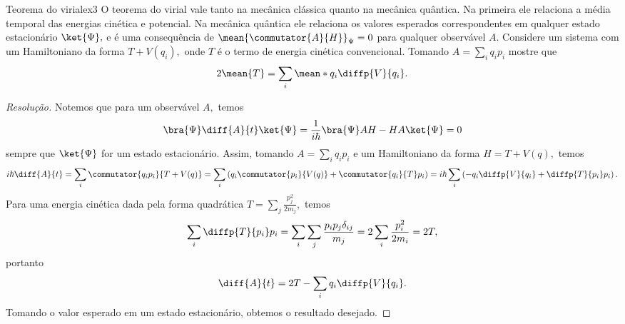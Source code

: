 \begin{exercício}{Teorema do virial}{ex3}
   O teorema do virial vale tanto na mecânica clássica quanto na mecânica quântica. Na primeira ele relaciona a média temporal das energias cinética e potencial. Na mecânica quântica ele relaciona os valores esperados correspondentes em qualquer estado estacionário \(\ket{\Psi},\) e é uma consequência de \(\mean{\commutator{A}{H}}_\Psi = 0\) para qualquer observável \(A.\) Considere um sistema com um Hamiltoniano da forma \(T + V(q_i),\) onde \(T\) é o termo de energia cinética convencional. Tomando \(A = \sum_i q_i p_i\) mostre que
   \begin{equation*}
      2 \mean{T} = \sum_i \mean*{q_i \diffp{V}{q_i}}.
   \end{equation*}
\end{exercício}
\begin{proof}[Resolução]
   Notemos que para um observável \(A,\) temos
   \begin{equation*}
      \bra{\Psi} \diff{A}{t}\ket{\Psi} = \frac{1}{i \hbar} \bra{\Psi} AH - HA \ket{\Psi} = 0
   \end{equation*}
   sempre que \(\ket{\Psi}\) for um estado estacionário. Assim, tomando \(A = \sum_{i} q_i p_i\) e um Hamiltoniano da forma \(H = T + V(q),\) temos
   \begin{equation*}
      i\hbar \diff{A}{t} = \sum_i \commutator{q_i p_i}{T + V(q)} = \sum_i \left(q_i \commutator{p_i}{V(q)} +  \commutator{q_i}{T} p_i\right) = i\hbar\sum_i \left(-q_i \diffp{V}{q_i} + \diffp{T}{p_i}p_i\right).
   \end{equation*}
   Para uma energia cinética dada pela forma quadrática \(T = \sum_j \frac{p_j^2}{2m_j},\) temos
   \begin{equation*}
      \sum_i \diffp{T}{p_i} p_i = \sum_i \sum_j \frac{p_i p_j \delta_{ij}}{m_j} = 2\sum_i \frac{p_i^2}{2m_i} = 2T,
   \end{equation*}
   portanto 
   \begin{equation*}
      \diff{A}{t} = 2T - \sum_{i} q_i \diffp{V}{q_i}.
   \end{equation*}
   Tomando o valor esperado em um estado estacionário, obtemos o resultado desejado.
\end{proof}

